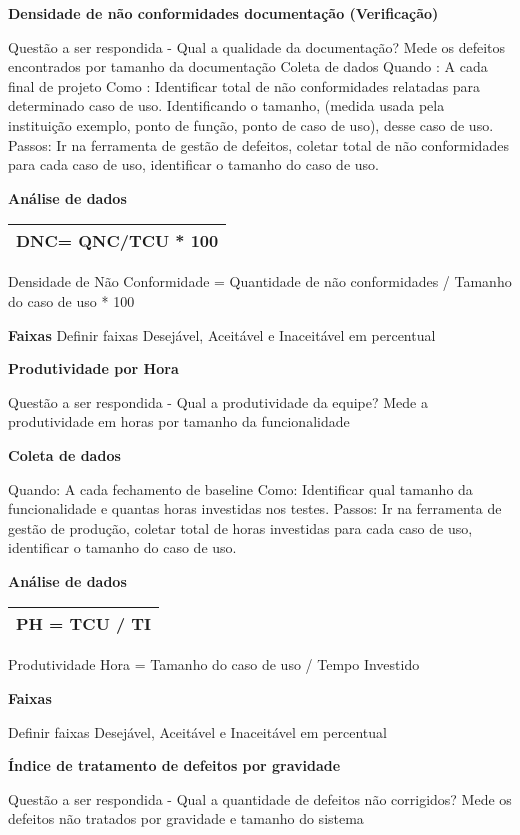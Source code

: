 \textbf{Densidade de não conformidades documentação (Verificação)}

Questão a ser respondida - Qual a qualidade da documentação? Mede os defeitos encontrados por tamanho da documentação Coleta de dados Quando : A cada final de projeto Como : Identificar total de não conformidades relatadas para determinado caso de uso. Identificando o tamanho, (medida usada pela instituição exemplo, ponto de função, ponto de caso de uso), desse caso de uso. Passos: Ir na ferramenta de gestão de defeitos, coletar total de não conformidades para cada caso de uso, identificar o tamanho do caso de uso.

\textbf{Análise de dados}

\begin{tabular}{|l|}
\hline
DNC= QNC/TCU * 100 \\ 
\hline
\end{tabular}

Densidade de Não Conformidade = Quantidade de não conformidades / Tamanho do caso de uso * 100

\textbf{Faixas} Definir faixas Desejável, Aceitável e Inaceitável em percentual

\textbf{Produtividade por Hora}

Questão a ser respondida - Qual a produtividade da equipe? Mede a produtividade em horas por tamanho da funcionalidade

\textbf{Coleta de dados}

Quando: A cada fechamento de baseline Como: Identificar qual tamanho da funcionalidade e quantas horas investidas nos testes. Passos: Ir na ferramenta de gestão de produção, coletar total de horas investidas para cada  caso de uso, identificar o tamanho do caso de uso.

\textbf{Análise de dados}

\begin{tabular}{|l|}
\hline
PH = TCU / TI \\ 
\hline
\end{tabular}

Produtividade Hora = Tamanho do caso de uso / Tempo Investido

\textbf{Faixas}

Definir faixas Desejável, Aceitável e Inaceitável em percentual

\textbf{Índice de tratamento de defeitos por gravidade}

Questão a ser respondida - Qual a quantidade de defeitos não corrigidos? Mede os defeitos não tratados por gravidade e tamanho do sistema

